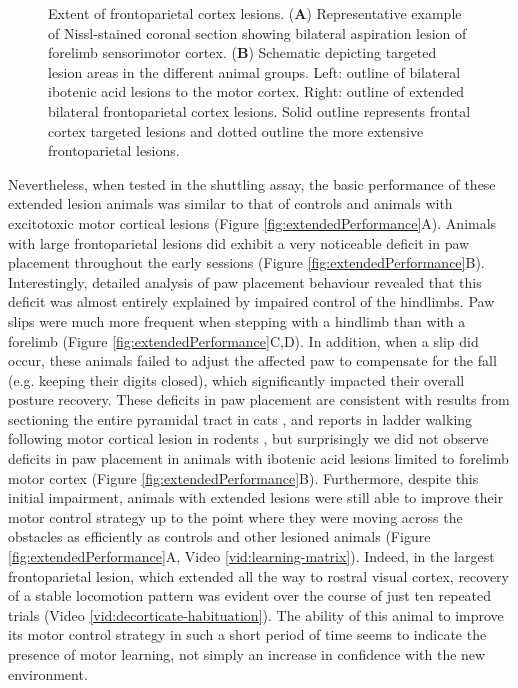 \begin{figure}
\centering

\caption{Extent of frontoparietal cortex lesions. (\textbf{A}) Representative example of Nissl-stained coronal section showing bilateral aspiration lesion of forelimb sensorimotor cortex. (\textbf{B}) Schematic depicting targeted lesion areas in the different animal groups. Left: outline of bilateral ibotenic acid lesions to the motor cortex. Right: outline of extended bilateral frontoparietal cortex lesions. Solid outline represents frontal cortex targeted lesions and dotted outline the more extensive frontoparietal lesions.}
\label{fig:extended}
\end{figure}

Nevertheless, when tested in the shuttling assay, the basic performance of these extended lesion animals was similar to that of controls and animals with excitotoxic motor cortical lesions (Figure \ref{fig:extendedPerformance}A). Animals with large frontoparietal lesions did exhibit a very noticeable deficit in paw placement throughout the early sessions (Figure \ref{fig:extendedPerformance}B). Interestingly, detailed analysis of paw placement behaviour revealed that this deficit was almost entirely explained by impaired control of the hindlimbs. Paw slips were much more frequent when stepping with a hindlimb than with a forelimb (Figure \ref{fig:extendedPerformance}C,D). In addition, when a slip did occur, these animals failed to adjust the affected paw to compensate for the fall (e.g. keeping their digits closed), which significantly impacted their overall posture recovery. These deficits in paw placement are consistent with results from sectioning the entire pyramidal tract in cats \cite{Liddell1944}, and reports in ladder walking following motor cortical lesion in rodents \cite{Metz2002}, but surprisingly we did not observe deficits in paw placement in animals with ibotenic acid lesions limited to forelimb motor cortex (Figure \ref{fig:extendedPerformance}B). Furthermore, despite this initial impairment, animals with extended lesions were still able to improve their motor control strategy up to the point where they were moving across the obstacles as efficiently as controls and other lesioned animals (Figure \ref{fig:extendedPerformance}A, Video \ref{vid:learning-matrix}). Indeed, in the largest frontoparietal lesion, which extended all the way to rostral visual cortex, recovery of a stable locomotion pattern was evident over the course of just ten repeated trials (Video \ref{vid:decorticate-habituation}). The ability of this animal to improve its motor control strategy in such a short period of time seems to indicate the presence of motor learning, not simply an increase in confidence with the new environment.

